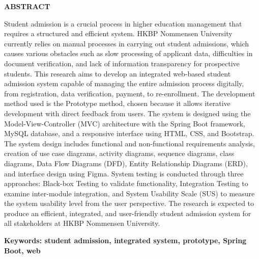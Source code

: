 \clearpage
{}%
\thispagestyle{fancy}

\begin{center}
	\large \bfseries \MakeUppercase{Abstract}\\
	\bigskip
	
	\normalsize \normalfont \justifying \singlespacing
	Student admission is a crucial process in higher education management that requires a structured and efficient system. HKBP Nommensen University currently relies on manual processes in carrying out student admissions, which causes various obstacles such as slow processing of applicant data, difficulties in document verification, and lack of information transparency for prospective students. This research aims to develop an integrated web-based student admission system capable of managing the entire admission process digitally, from registration, data verification, payment, to re-enrollment. The development method used is the Prototype method, chosen because it allows iterative development with direct feedback from users. The system is designed using the Model-View-Controller (MVC) architecture with the Spring Boot framework, MySQL database, and a responsive interface using HTML, CSS, and Bootstrap. The system design includes functional and non-functional requirements analysis, creation of use case diagrams, activity diagrams, sequence diagrams, class diagrams, Data Flow Diagrams (DFD), Entity Relationship Diagrams (ERD), and interface design using Figma. System testing is conducted through three approaches: Black-box Testing to validate functionality, Integration Testing to examine inter-module integration, and System Usability Scale (SUS) to measure the system usability level from the user perspective. The research is expected to produce an efficient, integrated, and user-friendly student admission system for all stakeholders at HKBP Nommensen University.\par
    
    \vspace{20pt}
	\raggedright\textbf{Keywords: student admission, integrated system, prototype, Spring Boot, web}
	
	\vfill
	
\end{center}
\clearpage
